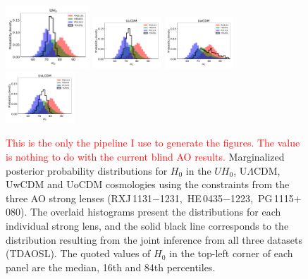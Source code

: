 \documentclass[useAMS,usenatbib]{mnras}
\newcommand\todo[1]{\textcolor{red}{#1}}
\newcommand\rxj{RXJ\,1131$-$1231}
\newcommand\he{HE\,0435$-$1223}
\newcommand\pg{PG\,1115$+$080}
\begin{document}
\begin{figure}
  \centering
  \includegraphics[width=0.28\textwidth,trim=0 0 0 0, clip]{UH0.pdf}
  \includegraphics[width=0.23\textwidth, trim=82 0 0 0,clip]{ULCDM.pdf}
  \includegraphics[width=0.23\textwidth,trim=82 0 0 0,clip]{UwCDM.pdf}
  \includegraphics[width=0.23\textwidth,trim=82 0 0 0, clip]{UoLCDM.pdf}
  \caption{\todo{This is the only the pipeline I use to generate the figures. The value is nothing to do with the current blind AO results.} Marginalized posterior probability distributions for $H_{0}$ in the $UH_{0}$, U$\Lambda$CDM, UwCDM and UoCDM cosmologies using the constraints from the three AO strong lenses (\rxj,~\he,~\pg ). The overlaid histograms present the distributions for each individual strong lens, and the solid black line corresponds to the distribution resulting from the joint inference from all three datasets (TDAOSL). The quoted values of $H_{0}$ in the top-left corner of each panel are the median, 16th and 84th percentiles.}
\label{fig:uniformcosmologies}
\end{figure}
\end{document}
